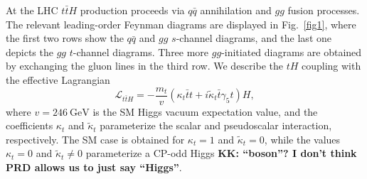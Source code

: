 \documentclass[aps,preprint,tightenlines,floatfix,superscriptaddress,nofootinbib,showpacs]{revtex4-1}
\def\beq{\begin{equation}}
\def\eeq{\end{equation}}
\def\tbar{\bar{t}}
\def\kp{\kappa_t}
\def\kpt{\tilde{\kappa}_t}
\begin{document}
At the LHC $t\bar{t}H$ production proceeds via $q\bar{q}$
annihilation and $gg$ fusion processes. The relevant leading-order Feynman
diagrams are displayed in Fig.~\ref{fig1}, where the first two
rows show the $q\bar{q}$ and $gg$ $s$-channel diagrams, and
the last one depicts the $gg$ $t$-channel diagrams.  Three more
$gg$-initiated diagrams are obtained by exchanging the gluon
lines in the third row.
We describe the $tH$ coupling with the effective Lagrangian
%
\beq
\label{eq1}
\mathcal{L}_{t\bar{t}H}=-\frac{m_t}{v}(\kp \tbar t+i\kpt \tbar
\gamma_5 t)H,
\eeq
%
where $v=246~\mathrm{GeV}$ is the SM Higgs vacuum
expectation value, and the coefficients $\kp$ and $\kpt$ parameterize 
the scalar and pseudoscalar interaction, respectively. The
SM case is obtained for $\kp=1$ and $\kpt=0$, while the values $\kp=0$
and $\kpt\neq 0$ parameterize a $\mathrm{CP}$-odd Higgs
{\bf KK: ``boson''? I don't think PRD allows us to just say ``Higgs''}. \par
\end{document}
